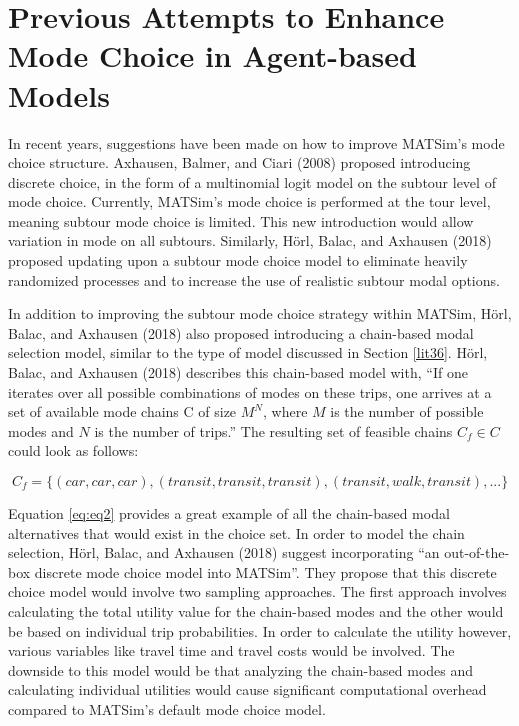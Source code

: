 \documentclass[12pt, oneside, openright]{byuthesis}
\begin{document}
\hypertarget{lit8}{%
\section{Previous Attempts to Enhance Mode Choice in Agent-based Models}\label{lit8}}

In recent years, suggestions have been made on how to improve MATSim's mode choice structure. Axhausen, Balmer, and Ciari (2008) proposed introducing discrete choice, in the form of a multinomial logit model on the subtour level of mode choice. Currently, MATSim's mode choice is performed at the tour level, meaning subtour mode choice is limited. This new introduction would allow variation in mode on all subtours. Similarly, Hörl, Balac, and Axhausen (2018) proposed updating upon a subtour mode choice model to eliminate heavily randomized processes and to increase the use of realistic subtour modal options.

In addition to improving the subtour mode choice strategy within MATSim, Hörl, Balac, and Axhausen (2018) also proposed introducing a chain-based modal selection model, similar to the type of model discussed in Section \ref{lit36}. Hörl, Balac, and Axhausen (2018) describes this chain-based model with, ``If one iterates over all possible combinations of modes on these trips, one arrives at a set of available mode chains C of size \(M^{N}\), where \(M\) is the number of possible modes and \(N\) is the number of trips.'' The resulting set of feasible chains \(C_f \in C\) could look as follows:

\begin{equation} 
  C_f = \{(car,car,car),(transit,transit,transit),(transit,walk,transit),...\}
  \label{eq:eq2}
\end{equation}

Equation \eqref{eq:eq2} provides a great example of all the chain-based modal alternatives that would exist in the choice set. In order to model the chain selection, Hörl, Balac, and Axhausen (2018) suggest incorporating ``an out-of-the-box discrete mode choice model into MATSim''. They propose that this discrete choice model would involve two sampling approaches. The first approach involves calculating the total utility value for the chain-based modes and the other would be based on individual trip probabilities. In order to calculate the utility however, various variables like travel time and travel costs would be involved. The downside to this model would be that analyzing the chain-based modes and calculating individual utilities would cause significant computational overhead compared to MATSim's default mode choice model.
\end{document}
